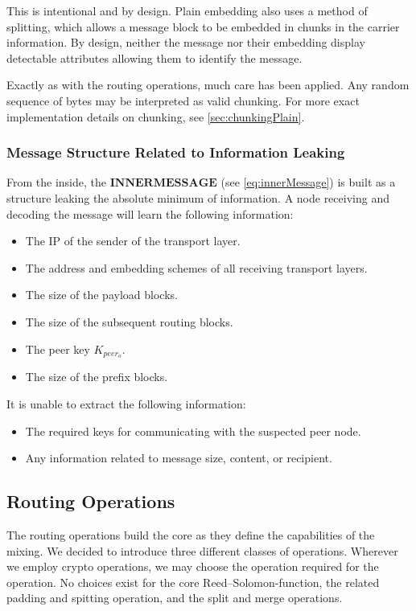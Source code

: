 This is intentional and by design. Plain embedding also uses a method of splitting, which allows a message block to be embedded in chunks in the carrier information. By design, neither the message nor their embedding display detectable attributes allowing them to identify the message. 

Exactly as with the routing operations, much care has been applied. Any random sequence of bytes may be interpreted as valid chunking. For more exact implementation details on chunking, see \cref{sec:chunkingPlain}.

\subsubsection{Message Structure Related to Information Leaking}
From the inside, the $\mathbf{INNERMESSAGE}$ (see \cref{eq:innerMessage}) is built as a structure leaking the absolute minimum of information. A node receiving and decoding the message will learn the following information:
\begin{itemize}
	\item The IP of the sender of the transport layer.
	\item The address and embedding schemes of all receiving transport layers.
	\item The size of the payload blocks.
	\item The size of the subsequent routing blocks.
	\item The peer key $K_{peer_o}$.
	\item The size of the prefix blocks.
\end{itemize}

It is unable to extract the following information:
\begin{itemize}
	\item The required keys for communicating with the suspected peer node.
	\item Any information related to message size, content, or recipient.
\end{itemize}

\subsection{Routing Operations}\label{sec:operations}
The routing operations build the core as they define the capabilities of the mixing. We decided to introduce three different classes of operations. Wherever we employ crypto operations, we may choose the operation required for the operation. No choices exist for the core Reed--Solomon-function, the related padding and spitting operation, and the split and merge operations.

